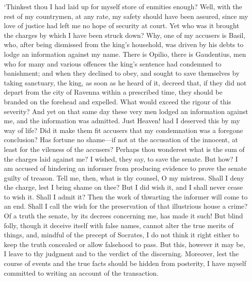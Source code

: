 \documentclass[12pt]{book}
\begin{document}
`Thinkest thou I had laid up for myself store of enmities enough? Well,
with the rest of my countrymen, at any rate, my safety should have been
assured, since my love of justice had left me no hope of security at
court. Yet who was it brought the charges by which I have been struck
down? Why, one of my accusers is Basil, who, after being dismissed from
the king's household, was driven by his debts to lodge an information
against my name. There is Opilio, there is Gaudentius, men who for many
and various offences the king's sentence had condemned to banishment;
and when they declined to obey, and sought to save themselves by taking
sanctuary, the king, as soon as he heard of it, decreed that, if they
did not depart from the city of Ravenna within a prescribed time, they
should be branded on the forehead and expelled. What would exceed the
rigour of this severity? And yet on that same day these very men lodged
an information against me, and the information was admitted. Just
Heaven! had I deserved this by my way of life? Did it make them fit
accusers that my condemnation was a foregone conclusion? Has fortune no
shame---if not at the accusation of the innocent, at least for the
vileness of the accusers? Perhaps thou wonderest what is the sum of the
charges laid against me? I wished, they say, to save the senate. But
how? I am accused of hindering an informer from producing evidence to
prove the senate guilty of treason. Tell me, then, what is thy counsel,
O my mistress. Shall I deny the charge, lest I bring shame on thee? But
I did wish it, and I shall never cease to wish it. Shall I admit it?
Then the work of thwarting the informer will come to an end. Shall I
call the wish for the preservation of that illustrious house a crime?
Of a truth the senate, by its decrees concerning me, has made it such!
But blind folly, though it deceive itself with false names, cannot alter
the true merits of things, and, mindful of the precept of Socrates, I do
not think it right either to keep the truth concealed or allow falsehood
to pass. But this, however it may be, I leave to thy judgment and to the
verdict of the discerning. Moreover, lest the course of events and the
true facts should be hidden from posterity, I have myself committed to
writing an account of the transaction.
\end{document}
